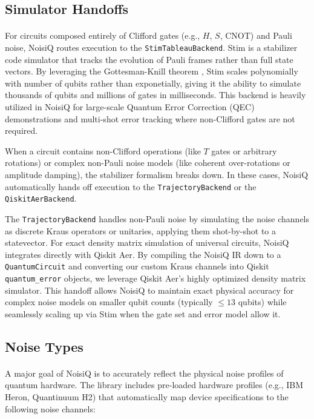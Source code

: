 \documentclass[10pt,twocolumn]{article}
\begin{document}
\subsection{Simulator Handoffs}
\label{subsec:simulator}

\paragraph{}
\label{paragraph:stim}
    For circuits composed entirely of Clifford gates (e.g., $H$, $S$, CNOT) and Pauli noise, NoisiQ routes execution to the \texttt{StimTableauBackend}\cite{stim2021}. 
Stim is a stabilizer code simulator that tracks the evolution of Pauli frames rather than full state vectors.
By leveraging the Gottesman-Knill theorem \cite{vandennest2008}, Stim scales polynomially with number of qubits rather than exponetially, giving it the ability to simulate thousands of qubits and millions of gates in milliseconds. 
This backend is heavily utilized in NoisiQ for large-scale Quantum Error Correction (QEC) demonstrations and multi-shot error tracking where non-Clifford gates are not required.

    When a circuit contains non-Clifford operations (like $T$ gates or arbitrary rotations) or complex non-Pauli noise models (like coherent over-rotations or amplitude damping), the stabilizer formalism breaks down. 
In these cases, NoisiQ automatically hands off execution to the \texttt{TrajectoryBackend} or the \texttt{QiskitAerBackend}\cite{qiskit2024}. 

    The \texttt{TrajectoryBackend} handles non-Pauli noise by simulating the noise channels as discrete Kraus operators or unitaries, applying them shot-by-shot to a statevector. 
For exact density matrix simulation of universal circuits, NoisiQ integrates directly with Qiskit Aer. 
By compiling the NoisiQ IR down to a \texttt{QuantumCircuit} and converting our custom Kraus channels into Qiskit \texttt{quantum\_error} objects, we leverage Qiskit Aer's highly optimized density matrix simulator. 
This handoff allows NoisiQ to maintain exact physical accuracy for complex noise models on smaller qubit counts (typically $\leq 13$ qubits) while seamlessly scaling up via Stim when the gate set and error model allow it.

\subsection{Noise Types}
\label{subsec:noise_types}
\paragraph{}
    A major goal of NoisiQ is to accurately reflect the physical noise profiles of quantum hardware.  
The library includes pre-loaded hardware profiles (e.g., IBM Heron, Quantinuum H2) that automatically map device specifications to the following noise channels:
\end{document}
